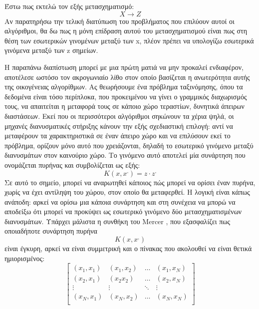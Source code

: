 		Έστω πως εκτελώ τον εξής μετασχηματισμό:
	   \begin{equation}
	   		X \rightarrow Z
	   \end{equation}
		Αν παρατηρήσω την τελική διατύπωση του προβλήματος που επιλύουν αυτοί οι αλγόριθμοι, θα δω πως η μόνη επίδραση αυτού του μετασχηματισμού είναι πως στη θέση των εσωτερικών γινομένων μεταξύ των x, πλέον πρέπει να υπολογίζω εσωτερικά γινόμενα μεταξύ των z σημείων.
		
		Η παραπάνω διαπίστωση μπορεί με μια πρώτη ματιά να μην προκαλεί ενδιαφέρον, αποτέλεσε ωστόσο τον ακρογωνιαίο λίθο στον οποίο βασίζεται η ανωτερότητα αυτής της οικογένειας αλγορίθμων. Ας θεωρήσουμε ένα πρόβλημα ταξινόμησης, όπου τα δεδομένα είναι τόσο περίπλοκα, που προκειμένου να γίνει ο γραμμικός διαχωρισμός τους, να απαιτείται η μεταφορά τους σε κάποιο χώρο τεραστίων, δυνητικά άπειρων διαστάσεων. Εκεί που οι περισσότεροι αλγόριθμοι σηκώνουν τα χέρια ψηλά, οι μηχανές διανυσματικές στήριξης κάνουν την εξής σχεδιαστική επιλογή: αντί να μεταφέρουν τα χαρακτηριστικά σε έναν άπειρο χώρο και να επιλύσουν εκεί το πρόβλημα, ορίζουν μόνο αυτό που χρειάζονται, δηλαδή το εσωτερικό γινόμενο μεταξύ διανυσμάτων στον καινούριο χώρο. Το γινόμενο αυτό αποτελεί μία συνάρτηση που ονομάζεται πυρήνας και συμβολίζεται ως εξής: 
		\begin{equation}
		K(x, x^,)= z \cdot z^,
		\end{equation}
		Σε αυτό το σημείο, μπορεί να αναρωτηθεί κάποιος πώς μπορεί να ορίσει έναν πυρήνα, χωρίς να έχει αντίληψη του χώρου, στον οποίο θα μεταφερθεί. Η λογική είναι κάπως ανάποδη: αρκεί να ορίσω μια κάποια συνάρτηση και στη συνέχεια να μπορώ να αποδείξω ότι μπορεί να προκύψει ως εσωτερικό γινόμενο δύο μετασχηματισμένων διανυσμάτων. Υπάρχει μάλιστα η συνθήκη του Mercer \citep{Mercer415}, που εξασφαλίζει πως οποιαδήποτε συνάρτηση πυρήνα
		\begin{equation}
		K(x, x^,)
		\end{equation}
		είναι έγκυρη, αρκεί να είναι συμμετρική και ο πίνακας που ακολουθεί να είναι θετικά ημιορισμένος:
		\begin{equation}
		\begin{bmatrix}
		(x_1, x_1) &  (x_1, x_2)  & \dots  &   (x_1, x_N) \\
		(x_2, x_1) &  (x_2 x_2)  & \dots  &   (x_2, x_N) \\
		\vdots  & \vdots &\ddots & \vdots \\
		(x_N, x_1) &  (x_N, x_2)  & \dots  &   (x_N, x_N) \\
		\end{bmatrix}
		\end{equation}
